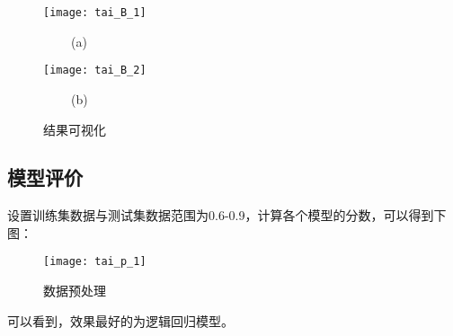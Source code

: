 \documentclass[withoutpreface,bwprint]{cumcmthesis} %
\begin{document}
\begin{figure}[H]
	\centering
	\begin{minipage}[t]{0.48\textwidth}
		\centering
		\texttt{[image: tai\_B\_1]}
		\centerline{$\ \ \ \ \ \ \ \ \ \ $(a)}
	\end{minipage}
	\begin{minipage}[t]{0.48\textwidth}
		\centering
		\texttt{[image: tai\_B\_2]}
		\centerline{$\ \ \ \ \ \ \ \ \ \ $(b)}
	\end{minipage}
	
	\caption{结果可视化}
\end{figure}




\subsection{模型评价}
\par 设置训练集数据与测试集数据范围为0.6-0.9，计算各个模型的分数，可以得到下图：

	\begin{figure}[H]
	\centering
	\centerline{\texttt{[image: tai\_p\_1]}}  
	\begin{center}
		\caption{数据预处理}
	\end{center}
\end{figure}
\par 可以看到，效果最好的为逻辑回归模型。



	
\end{document}
